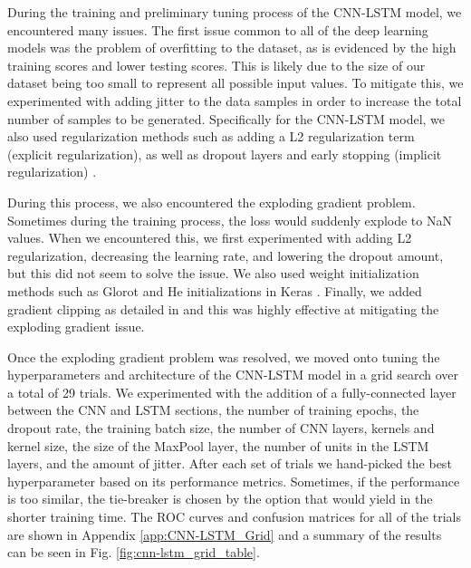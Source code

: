 \documentclass[format=sigconf, nonacm=true, review=true, screen=true]{acmart}
\begin{document}
During the training and preliminary tuning process of the CNN-LSTM model, we encountered many issues. The first issue common to all of the deep learning models was the problem of overfitting to the dataset, as is evidenced by the high training scores and lower testing scores. This is likely due to the size of our dataset being too small to represent all possible input values. To mitigate this, we experimented with adding jitter to the data samples in order to increase the total number of samples to be generated. Specifically for the CNN-LSTM model, we also used regularization methods such as adding a L2 regularization term (explicit regularization), as well as dropout layers and early stopping (implicit regularization) \cite{srivastava14a}.

During this process, we also encountered the exploding gradient problem. Sometimes during the training process, the loss would suddenly explode to NaN values. When we encountered this, we first experimented with adding L2 regularization, decreasing the learning rate, and lowering the dropout amount, but this did not seem to solve the issue.
We also used weight initialization methods such as Glorot and He initializations in Keras \cite{Glorot2010UnderstandingTD, HeZR015}.
Finally, we added gradient clipping as detailed in \cite{pascanu2012} and this was highly effective at mitigating the exploding gradient issue.


Once the exploding gradient problem was resolved, we moved onto tuning the hyperparameters and architecture of the CNN-LSTM model in a grid search over a total of 29 trials. We experimented with the addition of a fully-connected layer between the CNN and LSTM sections, the number of training epochs, the dropout rate, the training batch size, the number of CNN layers, kernels and kernel size, the size of the MaxPool layer, the number of units in the LSTM layers, and the amount of jitter. After each set of trials we hand-picked the best hyperparameter based on its performance metrics. Sometimes, if the performance is too similar, the tie-breaker is chosen by the option that would yield in the shorter training time. The ROC curves and confusion matrices for all of the trials are shown in Appendix \ref{app:CNN-LSTM_Grid} and a summary of the results can be seen in Fig. \ref{fig:cnn-lstm_grid_table}.
\end{document}
